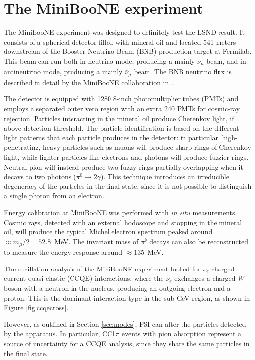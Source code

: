 \section{The MiniBooNE experiment}\label{sec:miniboone}
The MiniBooNE experiment was designed to definitely test the LSND result. It consists of a spherical detector filled with mineral oil and located 541 meters downstream of the Booster Neutrino Beam (BNB) production target at Fermilab. This beam can run both in neutrino mode, producing a mainly $\nu_{\mu}$ beam, and in antineutrino mode, producing a mainly $\bar{\nu}_{\mu}$ beam. The BNB neutrino flux is described in detail by the MiniBooNE collaboration in \cite{AguilarArevalo:2008yp}.

The detector is equipped with 1280 8-inch photomultiplier tubes (PMTs) and employs a separated outer veto region with an extra 240 PMTs for cosmic-ray rejection. Particles interacting in the mineral oil produce Cherenkov light, if above detection threshold. The particle identification is based on the different light patterns that each particle produces in the detector: in particular, high-penetrating, heavy particles such as muons will produce sharp rings of Cherenkov light, while lighter particles like electrons and photons will produce fuzzier rings. Neutral pion will instead produce two fuzzy rings partially overlapping when it decays to two photons ($\pi^{0}\rightarrow 2\gamma$). 
This technique introduces an irreducible degeneracy of the particles in the final state, since it is not possible to distinguish a single photon from an electron. 

Energy calibration at MiniBooNE was performed with \emph{in situ} measurements. Cosmic rays, detected with an external hodoscope and stopping in the mineral oil, will produce the typical Michel electron spectrum peaked around $\approx m_{\mu}/2 = 52.8$~MeV. The invariant mass of $\pi^0$ decays can also be reconstructed to measure the energy response around $\approx135$~MeV. 

The oscillation analysis of the MiniBooNE experiment looked for $\nu_e$ charged-current quasi-elastic (CCQE) interactions, where the $\nu_{e}$ exchanges a charged $W$ boson with a neutron in the nucleus, producing an outgoing electron and a proton. This is the dominant interaction type in the sub-GeV region, as shown in Figure \ref{fig:ccqecross}.

However, as outlined in Section \ref{sec:modes}, FSI can alter the particles detected by the apparatus. In particular, CC1$\pi$ events with pion absorption represent a source of uncertainty for a CCQE analysis, since they share the same particles in the final state.

